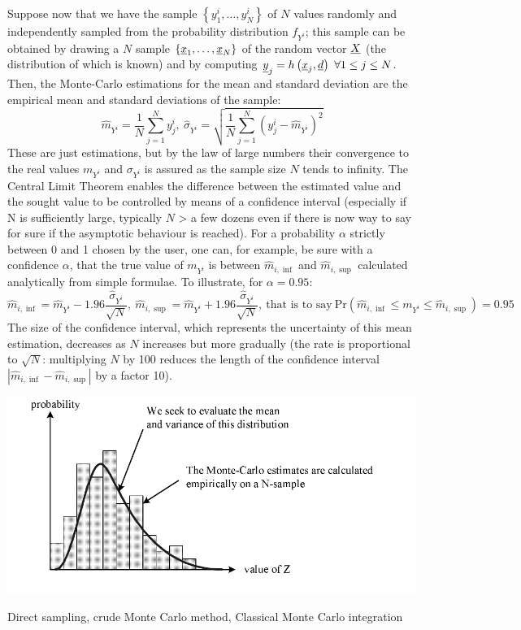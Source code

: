 {  Suppose now that we have the sample $\left\{ y^i_1,\ldots,y^i_N \right\}$ of $N$ values randomly and independently sampled from the probability distribution $f_{Y^i}$; this sample can be obtained by drawing a $N$ sample $\left\{ {\underline{x}}_1,\ldots,{\underline{x}}_N \right\}$ of the random vector ${\underline{X}}$ (the distribution of which is known) and by computing ${\underline{y}}_j = h \left( {\underline{x}}_j,\underline{d} \right) \ \forall 1 \leq j \leq N$.
  Then, the Monte-Carlo estimations for the mean and standard deviation are the empirical mean and standard deviations of the sample:
  $$
  \widehat{m}_{Y^i} = \frac{1}{N} \sum_{j=1}^N y^i_j,\ \widehat{\sigma}_{Y^i} = \sqrt{\frac{1}{N} \sum_{j=1}^N \left( y^i_j - \widehat{m}_{Y^i} \right)^2}
  $$
  These are just estimations, but by the law of large numbers their convergence to the real values $m_{Y^i}$ and $\sigma_{Y^i}$ is assured as the sample size $N$ tends to infinity. The Central Limit Theorem enables the difference between the estimated value and the sought value to be controlled by means of a confidence interval (especially if N is sufficiently large, typically $N$ > a few dozens even if there is now way to say for sure if the asymptotic behaviour is reached). For a probability $\alpha$ strictly between 0 and 1 chosen by the user, one can, for example, be sure with a confidence $\alpha$, that the true value of $m_{Y^i}$ is between $\widehat{m}_{i,\inf}$ and $\widehat{m}_{i,\sup}$ calculated analytically from simple formulae. To illustrate, for $\alpha = 0.95$:
  $$
  \widehat{m}_{i,\inf} = \widehat{m}_{Y^i} - 1.96 \frac{\displaystyle \widehat{\sigma}_{Y^i}}{\displaystyle \sqrt{N}},\ \widehat{m}_{i,\sup} = \widehat{m}_{Y^i} + 1.96 \frac{\widehat{\sigma}_{Y^i}}{\sqrt{N}},\ \textrm{that is to say}\ \textrm{Pr} \left(  \widehat{m}_{i,\inf} \leq m_{Y^i} \leq \widehat{m}_{i,\sup} \right) = 0.95
  $$
  The size of the confidence interval, which  represents the uncertainty of this mean estimation, decreases as $N$ increases but more gradually (the rate is proportional to $\sqrt{N}$: multiplying $N$ by 100 reduces the length of the confidence interval  $\left| \widehat{m}_{i,\inf}-\widehat{m}_{i,\sup} \right|$ by a factor 10).

  \begin{center}
    \includegraphics[scale=0.8]{MC.pdf}
  \end{center}
}
{
  Direct sampling, crude Monte Carlo method, Classical Monte Carlo integration
}

